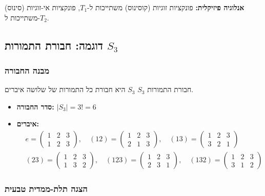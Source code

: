 \textbf{אנלוגיה פיזיקלית:} פונקציות זוגיות (קוסינוס) משתייכות ל-$T_1$, פונקציות אי-זוגיות (סינוס) משתייכות ל-$T_2$.

\subsection{דוגמה: חבורת התמורות $S_3$}

\subsubsection{מבנה החבורה}

\begin{definitionbox}{חבורת התמורות $S_3$}
$S_3$ היא חבורת כל התמורות של שלושה איברים.
\begin{itemize}
    \item \textbf{סדר החבורה:} $|S_3| = 3! = 6$
    \item \textbf{איברים:}
    \begin{align*}
    &e = \begin{pmatrix} 1 & 2 & 3 \\ 1 & 2 & 3 \end{pmatrix}, \quad
    (12) = \begin{pmatrix} 1 & 2 & 3 \\ 2 & 1 & 3 \end{pmatrix}, \quad
    (13) = \begin{pmatrix} 1 & 2 & 3 \\ 3 & 2 & 1 \end{pmatrix} \\
    &(23) = \begin{pmatrix} 1 & 2 & 3 \\ 1 & 3 & 2 \end{pmatrix}, \quad
    (123) = \begin{pmatrix} 1 & 2 & 3 \\ 2 & 3 & 1 \end{pmatrix}, \quad
    (132) = \begin{pmatrix} 1 & 2 & 3 \\ 3 & 1 & 2 \end{pmatrix}
    \end{align*}
\end{itemize}
\end{definitionbox}

\subsubsection{הצגה תלת-ממדית טבעית}

